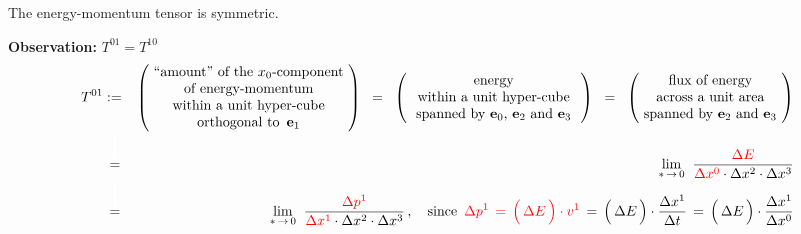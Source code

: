 
\vskip 0.5cm
\begin{theorem}
\mbox{}
\vskip 0.05cm
\noindent
The energy-momentum tensor is symmetric.
\end{theorem}
\proof
\vskip 0.3cm
\noindent
\textbf{Observation:}\; $T^{01} = T^{10}$
\begin{eqnarray*}
T^{01}
& := &
	\left(\!
		\begin{array}{c}
		\textnormal{``amount'' of the $x_{0}$-component}
		\\
		\textnormal{of energy-momentum}
		\\
		\textnormal{within a unit hyper-cube}
		\\
		\textnormal{orthogonal to \,$\mathbf{e}_{1}$}
		\end{array}
		\!\right)
\;\; = \;\;
	\left(\,
		\begin{array}{c}
		\textnormal{energy}
		\\
		\textnormal{within a unit hyper-cube}
		\\
		\textnormal{spanned by $\mathbf{e}_{0}$, $\mathbf{e}_{2}$ and $\mathbf{e}_{3}$}
		\end{array}
		\,\right)
\;\; = \;\;
	\left(\!
		\begin{array}{c}
		\textnormal{flux of energy}
		\\
		\textnormal{across a unit area}
		\\
		\textnormal{spanned by $\mathbf{e}_{2}$ and $\mathbf{e}_{3}$}
		\end{array}
		\!\right)
\\
& \overset{{\color{white}\textnormal{\Huge1}}}{=} &
	\underset{*\,\rightarrow\,0}{\lim}\;\;
	\dfrac{{\color{red}\Delta E}}{{\color{red}\Delta x^{0}}\cdot\Delta x^{2}\cdot\Delta x^{3}}
\\
& \overset{{\color{white}\textnormal{\Huge1}}}{=} &
	\underset{*\,\rightarrow\,0}{\lim}\;\;
	\dfrac{{\color{red}\Delta p^{1}}}{{\color{red}\Delta x^{1}}\cdot\Delta x^{2}\cdot\Delta x^{3}}\,,
	\quad
	\textnormal{since \,$
		{\color{red}\Delta p^{1}
		\,=\,
			\left(\,\overset{{\color{white}.}}{\Delta E}\,\right) \cdot v^{1}}
		\,=\,
			\left(\,\overset{{\color{white}.}}{\Delta E}\,\right)\cdot\dfrac{\Delta x^{1}}{\Delta t}
		\,=\,
			\left(\,\overset{{\color{white}.}}{\Delta E}\,\right)\cdot\dfrac{\Delta x^{1}}{\Delta x^{0}}
		$}
\\

\end{eqnarray*}
